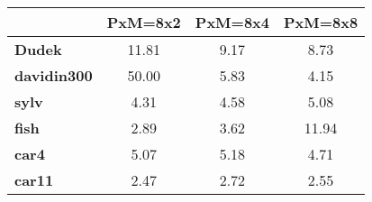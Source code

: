 \begin{tabular}{|l|c|c|c|}
\hline
&\textbf{PxM=8x2}&\textbf{PxM=8x4}&\textbf{PxM=8x8}\\\hline
\textbf{Dudek}&11.81&9.17&8.73\\\hline
\textbf{davidin300}&50.00&5.83&4.15\\\hline
\textbf{sylv}&4.31&4.58&5.08\\\hline
\textbf{fish}&2.89&3.62&11.94\\\hline
\textbf{car4}&5.07&5.18&4.71\\\hline
\textbf{car11}&2.47&2.72&2.55\\\hline
\end{tabular}

